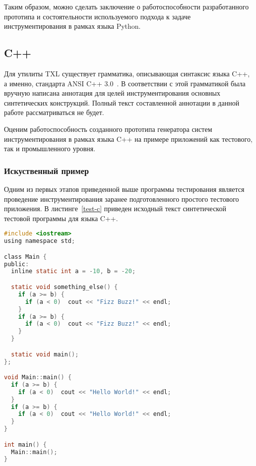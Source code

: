Таким образом, можно сделать заключение о работоспособности разработанного прототипа и состоятельности используемого подхода к задаче инструментирования в рамках языка Python.

\subsection{C++}

Для утилиты TXL существует грамматика, описывающая синтаксис языка C++, а именно, стандарта ANSI C++ 3.0~\cite{txl-resources}.
В соответствии с этой грамматикой была вручную написана аннотация для целей инструментирования основных синтетических конструкций.
Полный текст составленной аннотации в данной работе рассматриваться не будет.

Оценим работоспособность созданного прототипа генератора систем инструментирования в рамках языка C++ на примере приложений как тестового, так и промышленного уровня.

\subsubsection{Искуственный пример}

Одним из первых этапов приведенной выше программы тестирования является проведение инструментирования заранее подготовленного простого тестового приложения.
В листинге~\ref{test-c} приведен исходный текст синтетической тестовой программы для языка C++.

\begin{lstlisting}[frame=single, language=C, label={test-c}, caption={Исходный текст тестового приложения.}]
#include <iostream>
using namespace std;

class Main {
public:
  inline static int a = -10, b = -20;

  static void something_else() {
    if (a >= b) {
      if (a < 0)  cout << "Fizz Buzz!" << endl;
    }
    if (a >= b) {
      if (a < 0)  cout << "Fizz Buzz!" << endl;
    }
  }

  static void main();
};

void Main::main() {
  if (a >= b) {
    if (a < 0)  cout << "Hello World!" << endl;
  }
  if (a >= b) {
    if (a < 0)  cout << "Hello World!" << endl;
  }
}

int main() {
  Main::main();
}
\end{lstlisting}


